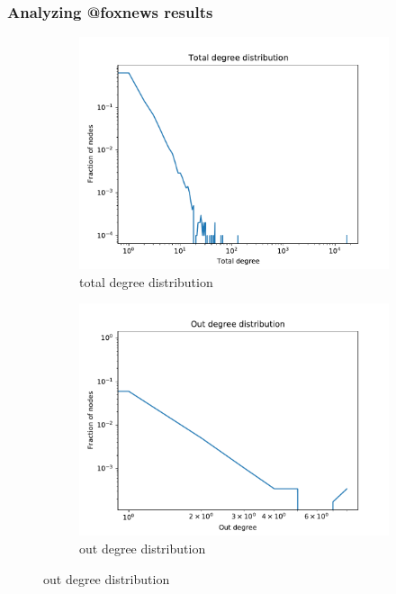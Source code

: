 \documentclass{beamer}
\begin{document}
\begin{frame}[c]
	\frametitle{Analyzing @foxnews results}

	\begin{figure}
		\begin{center}
			\begin{subfigure}[b]{0.4\textwidth}
				\centering
				\includegraphics[width=\textwidth]{out/foxnews4000/results/degree-total-dist.pdf}
				\caption{total degree distribution}
				\label{fig:out/foxnews4000/results/degree-total-dist.pdf}
			\end{subfigure}
			\begin{subfigure}[b]{0.4\textwidth}
				\centering
				\includegraphics[width=\textwidth]{out/results/degree-out-dist.pdf}
				\caption{out degree distribution}
				\label{fig:}
			\end{subfigure}
		\end{center}
	\end{figure}


\end{frame}
\end{document}
